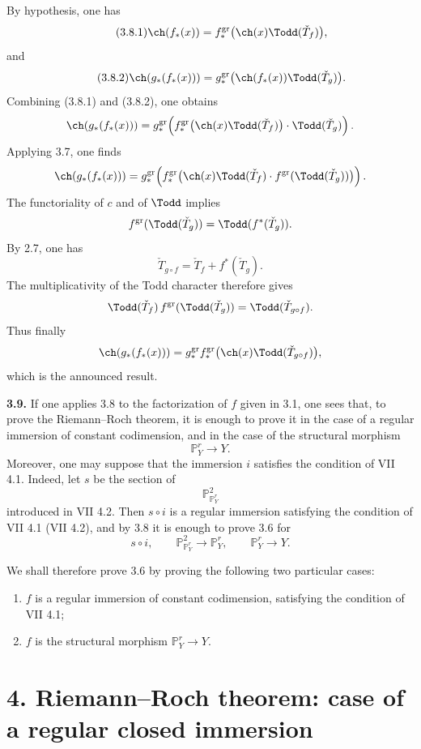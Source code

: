 By hypothesis, one has
\begin{equation}\tag{3.8.1}
 \ch(f_*(x))=
 f^{\mathrm{gr}}_*\bigl(\ch(x)\Todd(\check T_f)\bigr),
\end{equation}
and
\begin{equation}\tag{3.8.2}
 \ch(g_*(f_*(x)))=
 g^{\mathrm{gr}}_*\bigl(\ch(f_*(x))\Todd(\check T_g)\bigr).
\end{equation}
Combining (3.8.1) and (3.8.2), one obtains
\[
\ch(g_*(f_*(x)))=
g^{\mathrm{gr}}_*\!\left(
 f^{\mathrm{gr}}_*\bigl(\ch(x)\Todd(\check T_f)\bigr)\cdot \Todd(\check T_g)
\right).
\]
Applying 3.7, one finds
\[
\ch(g_*(f_*(x)))=
g^{\mathrm{gr}}_*\!\left(
 f^{\mathrm{gr}}_*\bigl(\ch(x)\Todd(\check T_f)\cdot
 f^{\mathrm{gr}}(\Todd(\check T_g))\bigr)
\right).
\]
The functoriality of \(c\) and of \(\Todd\) implies
\[
 f^{\mathrm{gr}}(\Todd(\check T_g))=\Todd(f^*(\check T_g)).
\]
By 2.7, one has
\[
 \check T_{g\circ f}=\check T_f+f^*(\check T_g).
\]
The multiplicativity of the Todd character therefore gives
\[
 \Todd(\check T_f)\,f^{\mathrm{gr}}(\Todd(\check T_g))
 =
 \Todd(\check T_{g\circ f}).
\]
Thus finally
\[
 \ch(g_*(f_*(x)))=
 g^{\mathrm{gr}}_* f^{\mathrm{gr}}_*\bigl(\ch(x)\Todd(\check T_{g\circ f})\bigr),
\]
which is the announced result.

\textbf{3.9.} If one applies 3.8 to the factorization of \(f\) given in 3.1, one sees that, to prove the Riemann--Roch theorem, it is enough to prove it in the case of a regular immersion of constant codimension, and in the case of the structural morphism
\[
 \mathbb P^r_Y\longrightarrow Y .
\]
Moreover, one may suppose that the immersion \(i\) satisfies the condition of VII 4.1. Indeed, let \(s\) be the section of
\[
 \mathbb P^2_{\mathbb P^r_Y}
\]
introduced in VII 4.2. Then \(s\circ i\) is a regular immersion satisfying the condition of VII 4.1 (VII 4.2), and by 3.8 it is enough to prove 3.6 for
\[
s\circ i,\qquad
\mathbb P^2_{\mathbb P^r_Y}\longrightarrow\mathbb P^r_Y,\qquad
\mathbb P^r_Y\longrightarrow Y .
\]

We shall therefore prove 3.6 by proving the following two particular cases:
\begin{enumerate}[label=\roman*)]
\item \(f\) is a regular immersion of constant codimension, satisfying the condition of VII 4.1;
\item \(f\) is the structural morphism \(\mathbb P^r_Y\to Y\).
\end{enumerate}

\section*{4. Riemann--Roch theorem: case of a regular closed immersion}

